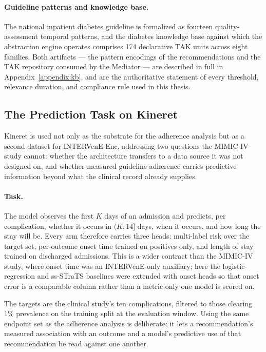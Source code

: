 \paragraph{Guideline patterns and knowledge base.}
The national inpatient diabetes guideline is formalized as fourteen
quality-assessment temporal patterns, and the diabetes knowledge base
against which the abstraction engine operates comprises 174 declarative TAK
units across eight families. Both artifacts --- the pattern encodings of the
recommendations and the TAK repository consumed by the Mediator --- are
described in full in Appendix~\ref{appendix:kb}, and are the authoritative
statement of every threshold, relevance duration, and compliance rule used
in this thesis.

\subsection{The Prediction Task on Kineret}
\label{sec:method-kineret-task}
\label{sec:evalm-kineret-task}

Kineret is used not only as the substrate for the adherence analysis but as a second dataset for INTERVenE-Enc, addressing two questions the MIMIC-IV study cannot: whether the architecture transfers to a data source it was not designed on, and whether measured guideline adherence carries predictive information beyond what the clinical record already supplies.

\paragraph{Task.}
The model observes the first $K$ days of an admission and predicts, per complication, whether it occurs in $(K, 14]$ days, when it occurs, and how long the stay will be. Every arm therefore carries three heads: multi-label risk over the target set, per-outcome onset time trained on positives only, and length of stay trained on discharged admissions. This is a wider contract than the MIMIC-IV study, where onset time was an INTERVenE-only auxiliary; here the logistic-regression and ss-STraTS baselines were extended with onset heads so that onset error is a comparable column rather than a metric only one model is scored on.

The targets are the clinical study's ten complications, filtered to those clearing $1\%$ prevalence on the training split at the evaluation window. Using the same endpoint set as the adherence analysis is deliberate: it lets a recommendation's measured association with an outcome and a model's predictive use of that recommendation be read against one another.

